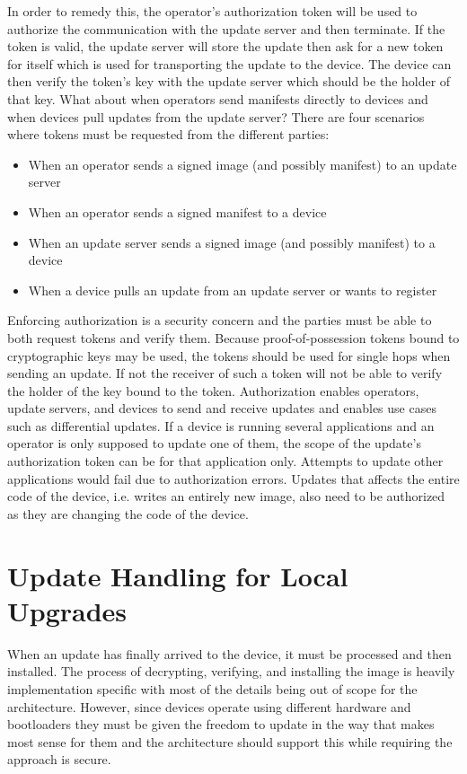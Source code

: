 \documentclass[0-thesis.tex]{subfiles}
\begin{document}
In order to remedy this, the operator's authorization token will be used to authorize the
communication with the update server and then terminate. If the token is valid, the update
server will store the update then ask for a new token for itself which is used for
transporting the update to the device. The device can then verify the token's key with the
update server which should be the holder of that key. What about when operators send
manifests directly to devices and when devices pull updates from the update server? There
are four scenarios where tokens must be requested from the different parties:

\begin{itemize}
    \item When an operator sends a signed image (and possibly manifest) to an update
            server
    \item When an operator sends a signed manifest to a device
    \item When an update server sends a signed image (and possibly manifest) to a device
    \item When a device pulls an update from an update server or wants to register
\end{itemize}

Enforcing authorization is a security concern and the parties must be able to both request
tokens and verify them. Because proof-of-possession tokens bound to cryptographic keys may
be used, the tokens should be used for single hops when sending an update. If not the
receiver of such a token will not be able to verify the holder of the key bound to the
token. Authorization enables operators, update servers, and devices to send and receive
updates and enables use cases such as differential updates. If a device is running several
applications and an operator is only supposed to update one of them, the scope of the
update's authorization token can be for that application only. Attempts to update other
applications would fail due to authorization errors. Updates that affects the entire code
of the device, i.e. writes an entirely new image, also need to be authorized as they are
changing the code of the device.

\section{Update Handling for Local Upgrades}
\label{sec:upgrading}
When an update has finally arrived to the device, it must be processed and then installed.
The process of decrypting, verifying, and installing the image is heavily implementation
specific with most of the details being out of scope for the architecture. However, since
devices operate using different hardware and bootloaders they must be given the freedom to
update in the way that makes most sense for them and the architecture should support this
while requiring the approach is secure.
\end{document}
